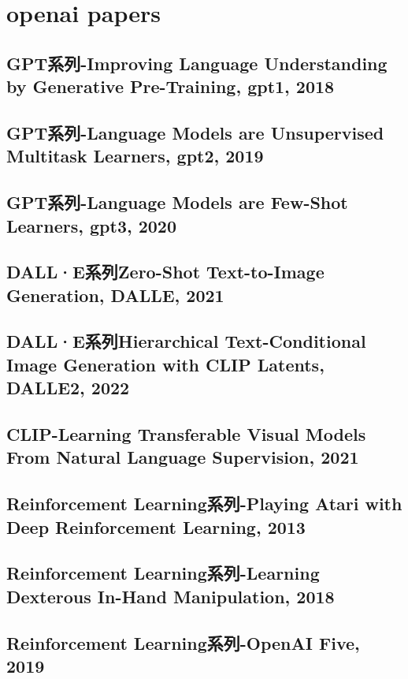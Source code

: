 \documentclass[twocolumn, 10pt]{article} %
\begin{document}
\section{openai papers}

\subsection{ GPT系列-Improving Language Understanding by Generative Pre-Training, gpt1, 2018}

\subsection{GPT系列-Language Models are Unsupervised Multitask Learners, gpt2, 2019}

\subsection{GPT系列-Language Models are Few-Shot Learners, gpt3, 2020}


\subsection{DALL·E系列Zero-Shot Text-to-Image Generation, DALLE, 2021}

\subsection{DALL·E系列Hierarchical Text-Conditional Image Generation with CLIP Latents, DALLE2, 2022}

\subsection{CLIP-Learning Transferable Visual Models From Natural Language Supervision, 2021}


\subsection{Reinforcement Learning系列-Playing Atari with Deep Reinforcement Learning, 2013}


\subsection{Reinforcement Learning系列-Learning Dexterous In-Hand Manipulation, 2018}


\subsection{Reinforcement Learning系列-OpenAI Five, 2019}
\end{document}
